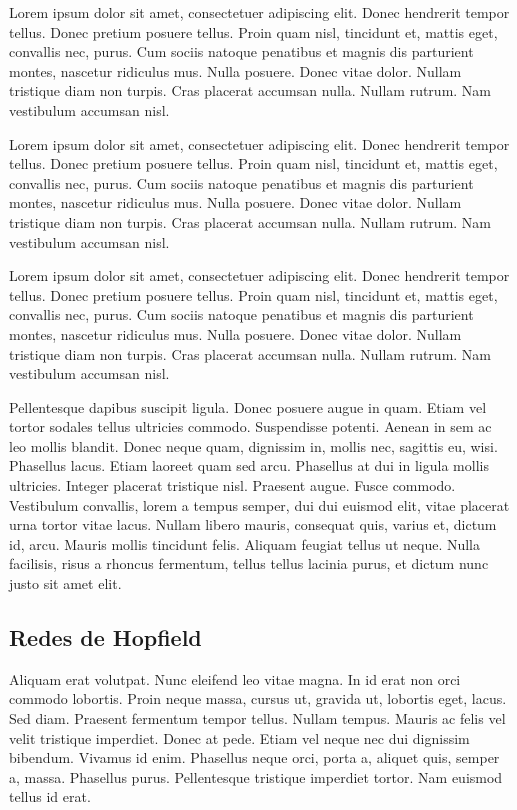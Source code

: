 Lorem ipsum dolor sit amet, consectetuer adipiscing elit.  Donec
hendrerit tempor tellus.  Donec pretium posuere tellus.  Proin quam
nisl, tincidunt et, mattis eget, convallis nec, purus.  Cum sociis
natoque penatibus et magnis dis parturient montes, nascetur ridiculus
mus.  Nulla posuere.  Donec vitae dolor.  Nullam tristique diam non
turpis.  Cras placerat accumsan nulla.  Nullam rutrum.  Nam vestibulum
accumsan nisl.

Lorem ipsum dolor sit amet, consectetuer adipiscing elit.  Donec
hendrerit tempor tellus.  Donec pretium posuere tellus.  Proin quam
nisl, tincidunt et, mattis eget, convallis nec, purus.  Cum sociis
natoque penatibus et magnis dis parturient montes, nascetur ridiculus
mus.  Nulla posuere.  Donec vitae dolor.  Nullam tristique diam non
turpis.  Cras placerat accumsan nulla.  Nullam rutrum.  Nam vestibulum
accumsan nisl.

Lorem ipsum dolor sit amet, consectetuer adipiscing elit.  Donec
hendrerit tempor tellus.  Donec pretium posuere tellus.  Proin quam
nisl, tincidunt et, mattis eget, convallis nec, purus.  Cum sociis
natoque penatibus et magnis dis parturient montes, nascetur ridiculus
mus.  Nulla posuere.  Donec vitae dolor.  Nullam tristique diam non
turpis.  Cras placerat accumsan nulla.  Nullam rutrum.  Nam vestibulum
accumsan nisl.

Pellentesque dapibus suscipit ligula.  Donec posuere augue in quam.
Etiam vel tortor sodales tellus ultricies commodo.  Suspendisse
potenti.  Aenean in sem ac leo mollis blandit.  Donec neque quam,
dignissim in, mollis nec, sagittis eu, wisi.  Phasellus lacus.  Etiam
laoreet quam sed arcu.  Phasellus at dui in ligula mollis ultricies.
Integer placerat tristique nisl.  Praesent augue.  Fusce commodo.
Vestibulum convallis, lorem a tempus semper, dui dui euismod elit,
vitae placerat urna tortor vitae lacus.  Nullam libero mauris,
consequat quis, varius et, dictum id, arcu.  Mauris mollis tincidunt
felis.  Aliquam feugiat tellus ut neque.  Nulla facilisis, risus a
rhoncus fermentum, tellus tellus lacinia purus, et dictum nunc justo
sit amet elit.

\subsection{Redes de Hopfield}

Aliquam erat volutpat.  Nunc eleifend leo vitae magna.  In id erat non
orci commodo lobortis.  Proin neque massa, cursus ut, gravida ut,
lobortis eget, lacus.  Sed diam.  Praesent fermentum tempor tellus.
Nullam tempus.  Mauris ac felis vel velit tristique imperdiet.  Donec
at pede.  Etiam vel neque nec dui dignissim bibendum.  Vivamus id
enim.  Phasellus neque orci, porta a, aliquet quis, semper a, massa.
Phasellus purus.  Pellentesque tristique imperdiet tortor.  Nam
euismod tellus id erat.

